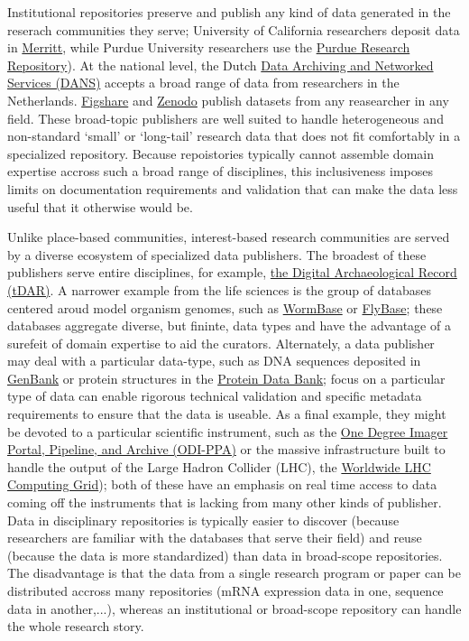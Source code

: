 \documentclass[10pt,a4paper,twocolumn]{article}
\begin{document}
Institutional repositories preserve and publish any kind of data generated in the reserach communities they serve; University of California researchers deposit data in \href{https://merritt.cdlib.org/}{Merritt}, while Purdue University researchers use the \href{https://purr.purdue.edu/}{Purdue Research Repository}).
At the national level, the Dutch \href{http://www.dans.knaw.nl/en}{Data Archiving and Networked Services (DANS)} accepts a broad range of data from researchers in the Netherlands.
\href{http://figshare.com/}{Figshare} and \href{http://zenodo.org/}{Zenodo} publish datasets from any reasearcher in any field.
These broad-topic publishers are well suited to handle heterogeneous and non-standard `small' or `long-tail' research data that does not fit comfortably in a specialized repository.
Because repoistories typically cannot assemble domain expertise accross such a broad range of disciplines, this inclusiveness imposes limits on documentation requirements and validation that can make the data less useful that it otherwise would be.

Unlike place-based communities, interest-based research communities are served by a diverse ecosystem of specialized data publishers.
The broadest of these publishers serve entire disciplines, for example, \href{http://www.tdar.org/}{the Digital Archaeological Record (tDAR)}.
A narrower example from the life sciences is the group of databases centered aroud model organism genomes, such as \href{http://www.wormbase.org/}{WormBase}\cite{harris_wormbase_2014} or \href{http://flybase.org/}{FlyBase}\cite{pierre_flybase_2014}; these databases aggregate diverse, but fininte, data types and have the advantage of a surefeit of domain expertise to aid the curators.
Alternately, a data publisher may deal with a particular data-type, such as DNA sequences deposited in \href{http://www.ncbi.nlm.nih.gov/genbank/}{GenBank}\cite{benson_genbank_2013} or protein structures in the \href{http://www.rcsb.org/}{Protein Data Bank}\cite{berman_protein_2000}; focus on a particular type of data can enable rigorous technical validation and specific metadata requirements to ensure that the data is useable.
As a final example, they might be devoted to a particular scientific instrument, such as the \href{http://portal.odi.iu.edu}{One Degree Imager Portal, Pipeline, and Archive (ODI-PPA)} or the massive infrastructure built to handle the output of the Large Hadron Collider (LHC), the \href{http://wlcg.web.cern.ch/}{Worldwide LHC Computing Grid}); both of these have an emphasis on real time access to data coming off the instruments that is lacking from many other kinds of publisher.
Data in disciplinary repositories is typically easier to discover (because researchers are familiar with the databases that serve 
their field) and reuse (because the data is more standardized) than data in broad-scope repositories.
The disadvantage is that the data from a single research program or paper can be distributed accross many repositories (mRNA expression data in one, sequence data in another,...), whereas an institutional or broad-scope repository can handle the whole research story.
\end{document}
